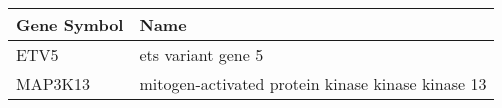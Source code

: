 \begin{tabular}{ll}
\toprule
Gene Symbol &                                              Name \\
\midrule
       ETV5 &                                ets variant gene 5 \\
    MAP3K13 & mitogen-activated protein kinase kinase kinase 13 \\
\bottomrule
\end{tabular}
